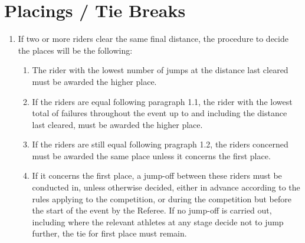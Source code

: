 \section{Placings / Tie Breaks}
\begin{enumerate}[leftmargin=1.5em,labelsep=*]
	\item If two or more riders clear the same final distance, the procedure to decide the places will be the following:
	\begin{enumerate}[label*=\arabic*,leftmargin=1.5em,labelsep=*]
		\item The rider with the lowest number of jumps at the distance last cleared must be awarded the higher place.
		\item If the riders are equal following paragraph 1.1, the rider with the lowest total of failures throughout the event up to and including the distance last cleared, must be awarded the higher place.
		\item If the riders are still equal following pragraph 1.2, the riders concerned must be awarded the same place unless it concerns the first place.
		\item If it concerns the first place, a jump-off between these riders must be conducted in, unless otherwise decided, either in advance according to the rules applying to the competition, or during the competition but before the start of the event by the Referee. If no jump-off is carried out, including where the relevant athletes at any stage decide not to jump further, the tie for first place must remain.
	\end{enumerate}
\end{enumerate}